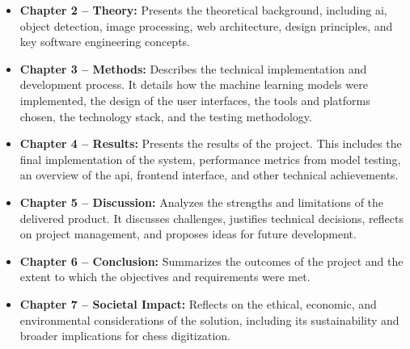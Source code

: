 \begin{itemize}
    
    \item \textbf{Chapter 2 -- Theory:} Presents the theoretical background, including \gls{ai}, object detection, image processing, web architecture, design principles, and key software engineering concepts.
    
    \item \textbf{Chapter 3 -- Methods:} Describes the technical implementation and development process. It details how the machine learning models were implemented, the design of the user interfaces, the tools and platforms chosen, the technology stack, and the testing methodology.
    
    \item \textbf{Chapter 4 -- Results:} Presents the results of the project. This includes the final implementation of the system, performance metrics from model testing, an overview of the \gls{api}, frontend interface, and other technical achievements.
    
    \item \textbf{Chapter 5 -- Discussion:} Analyzes the strengths and limitations of the delivered product. It discusses challenges, justifies technical decisions, reflects on project management, and proposes ideas for future development.
    
    \item \textbf{Chapter 6 -- Conclusion:} Summarizes the outcomes of the project and the extent to which the objectives and requirements were met.

    \item \textbf{Chapter 7 -- Societal Impact:} Reflects on the ethical, economic, and environmental considerations of the solution, including its sustainability and broader implications for chess digitization.
    
\end{itemize}